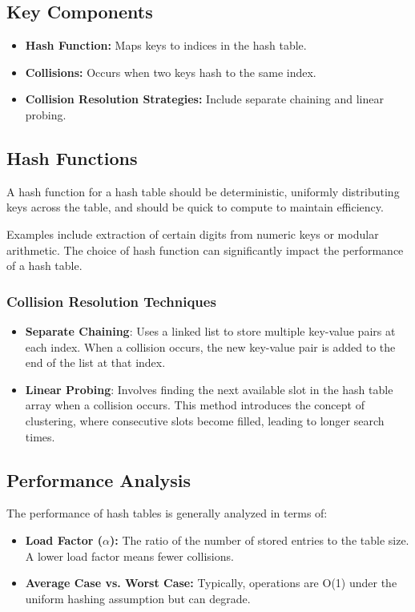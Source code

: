 \documentclass{article}
\begin{document}
\subsection{Key Components}
\begin{itemize}
    \item \textbf{Hash Function:} Maps keys to indices in the hash table.
    \item \textbf{Collisions:} Occurs when two keys hash to the same index.
    \item \textbf{Collision Resolution Strategies:} Include separate chaining and linear probing.
\end{itemize}

\subsection{Hash Functions}

A hash function for a hash table should be deterministic, uniformly distributing keys across the table, and should be quick to compute to maintain efficiency.

Examples include extraction of certain digits from numeric keys or modular arithmetic. The choice of hash function can significantly impact the performance of a hash table.

\subsubsection{Collision Resolution Techniques}

\begin{itemize}
    \item \textbf{Separate Chaining}: Uses a linked list to store multiple key-value pairs at each index. When a collision occurs, the new key-value pair is added to the end of the list at that index.
    \item \textbf{Linear Probing}: Involves finding the next available slot in the hash table array when a collision occurs. This method introduces the concept of clustering, where consecutive slots become filled, leading to longer search times.
\end{itemize}

\subsection{Performance Analysis}

The performance of hash tables is generally analyzed in terms of:
\begin{itemize}
    \item \textbf{Load Factor ($\alpha$):} The ratio of the number of stored entries to the table size. A lower load factor means fewer collisions.
    \item \textbf{Average Case vs. Worst Case:} Typically, operations are O(1) under the uniform hashing assumption but can degrade.
\end{itemize}
\end{document}
